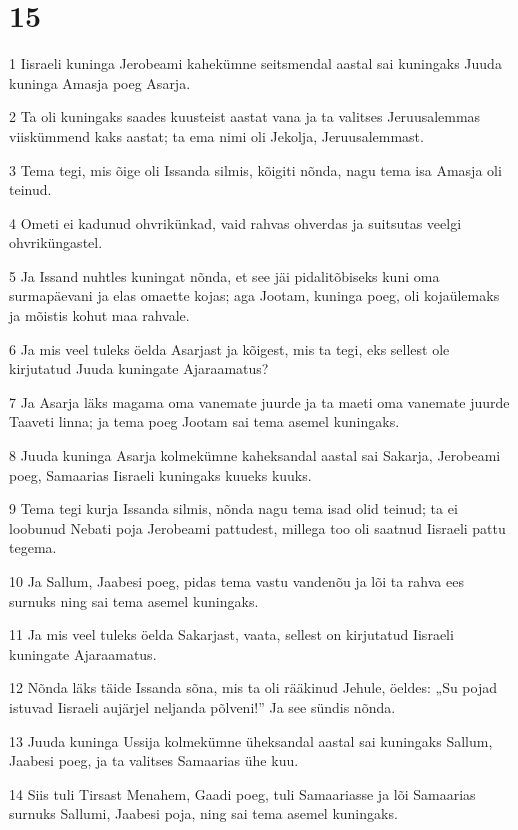 \chapter{15}

\par 1 Iisraeli kuninga Jerobeami kahekümne seitsmendal aastal sai kuningaks Juuda kuninga Amasja poeg Asarja.
\par 2 Ta oli kuningaks saades kuusteist aastat vana ja ta valitses Jeruusalemmas viiskümmend kaks aastat; ta ema nimi oli Jekolja, Jeruusalemmast.
\par 3 Tema tegi, mis õige oli Issanda silmis, kõigiti nõnda, nagu tema isa Amasja oli teinud.
\par 4 Ometi ei kadunud ohvrikünkad, vaid rahvas ohverdas ja suitsutas veelgi ohvriküngastel.
\par 5 Ja Issand nuhtles kuningat nõnda, et see jäi pidalitõbiseks kuni oma surmapäevani ja elas omaette kojas; aga Jootam, kuninga poeg, oli kojaülemaks ja mõistis kohut maa rahvale.
\par 6 Ja mis veel tuleks öelda Asarjast ja kõigest, mis ta tegi, eks sellest ole kirjutatud Juuda kuningate Ajaraamatus?
\par 7 Ja Asarja läks magama oma vanemate juurde ja ta maeti oma vanemate juurde Taaveti linna; ja tema poeg Jootam sai tema asemel kuningaks.
\par 8 Juuda kuninga Asarja kolmekümne kaheksandal aastal sai Sakarja, Jerobeami poeg, Samaarias Iisraeli kuningaks kuueks kuuks.
\par 9 Tema tegi kurja Issanda silmis, nõnda nagu tema isad olid teinud; ta ei loobunud Nebati poja Jerobeami pattudest, millega too oli saatnud Iisraeli pattu tegema.
\par 10 Ja Sallum, Jaabesi poeg, pidas tema vastu vandenõu ja lõi ta rahva ees surnuks ning sai tema asemel kuningaks.
\par 11 Ja mis veel tuleks öelda Sakarjast, vaata, sellest on kirjutatud Iisraeli kuningate Ajaraamatus.
\par 12 Nõnda läks täide Issanda sõna, mis ta oli rääkinud Jehule, öeldes: „Su pojad istuvad Iisraeli aujärjel neljanda põlveni!” Ja see sündis nõnda.
\par 13 Juuda kuninga Ussija kolmekümne üheksandal aastal sai kuningaks Sallum, Jaabesi poeg, ja ta valitses Samaarias ühe kuu.
\par 14 Siis tuli Tirsast Menahem, Gaadi poeg, tuli Samaariasse ja lõi Samaarias surnuks Sallumi, Jaabesi poja, ning sai tema asemel kuningaks.
